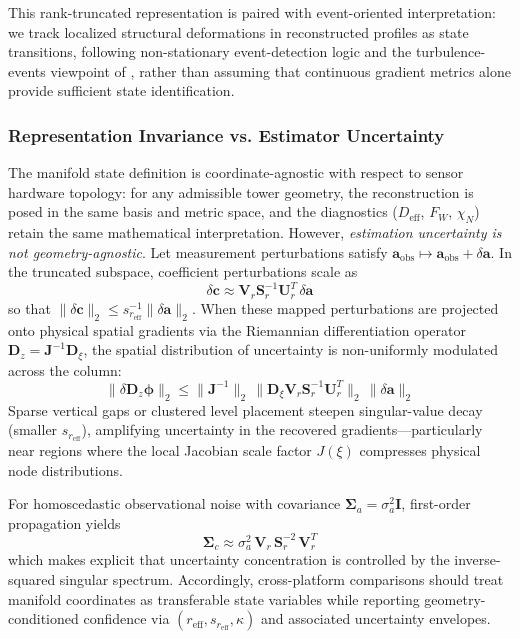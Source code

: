 This rank-truncated representation is paired with event-oriented interpretation: we track localized structural deformations in reconstructed profiles as state transitions, following non-stationary event-detection logic \citep{Kang2014a} and the turbulence-events viewpoint of \citet{Narasimha1995}, rather than assuming that continuous gradient metrics alone provide sufficient state identification.

\subsubsection{Representation Invariance vs. Estimator Uncertainty}
The manifold state definition is coordinate-agnostic with respect to sensor hardware topology: for any admissible tower geometry, the reconstruction is posed in the same basis and metric space, and the diagnostics ($D_{\mathrm{eff}}$, $F_W$, $\chi_N$) retain the same mathematical interpretation. However, \emph{estimation uncertainty is not geometry-agnostic}. Let measurement perturbations satisfy $\mathbf{a}_{\mathrm{obs}} \mapsto \mathbf{a}_{\mathrm{obs}} + \delta \mathbf{a}$. In the truncated subspace, coefficient perturbations scale as
\begin{equation}
\delta \mathbf{c} \approx \mathbf{V}_r \mathbf{S}_r^{-1} \mathbf{U}_r^T \, \delta \mathbf{a}
\label{eq:svd_uncertainty_map}
\end{equation}
so that $\|\delta \mathbf{c}\|_2 \le s_{r_{\mathrm{eff}}}^{-1}\|\delta \mathbf{a}\|_2$. When these mapped perturbations are projected onto physical spatial gradients via the Riemannian differentiation operator $\mathbf{D}_z = \mathbf{J}^{-1}\mathbf{D}_{\xi}$, the spatial distribution of uncertainty is non-uniformly modulated across the column:
\begin{equation}
\|\delta \mathbf{D}_z \mathbf{\phi}\|_2 \le \|\mathbf{J}^{-1}\|_2 \, \|\mathbf{D}_{\xi} \mathbf{V}_r \mathbf{S}_r^{-1} \mathbf{U}_r^T\|_2 \, \|\delta \mathbf{a}\|_2
\end{equation}
Sparse vertical gaps or clustered level placement steepen singular-value decay (smaller $s_{r_{\mathrm{eff}}}$), amplifying uncertainty in the recovered gradients---particularly near regions where the local Jacobian scale factor $J(\xi)$ compresses physical node distributions.

For homoscedastic observational noise with covariance $\mathbf{\Sigma}_a = \sigma_a^2\mathbf{I}$, first-order propagation yields
\begin{equation}
\mathbf{\Sigma}_c \approx \sigma_a^2\, \mathbf{V}_r\, \mathbf{S}_r^{-2}\, \mathbf{V}_r^T
\label{eq:svd_covariance}
\end{equation}
which makes explicit that uncertainty concentration is controlled by the inverse-squared singular spectrum. Accordingly, cross-platform comparisons should treat manifold coordinates as transferable state variables while reporting geometry-conditioned confidence via $(r_{\mathrm{eff}}, s_{r_{\mathrm{eff}}}, \kappa)$ and associated uncertainty envelopes.


